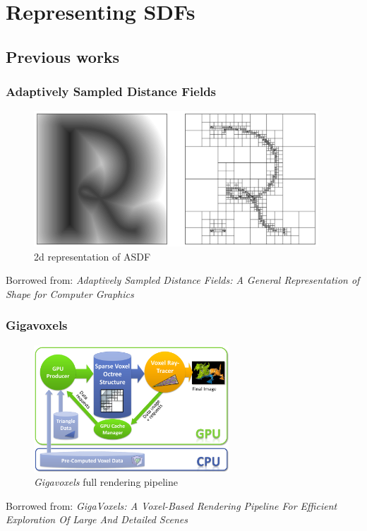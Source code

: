 \documentclass[handout]{beamer}
\begin{document}
\section{Representing SDFs}
\subsection{Previous works}
\begin{frame}
  \frametitle{Adaptively Sampled Distance Fields}
  \begin{figure}
    \centering
    \includegraphics[width=0.95\textwidth]{figures/asdf.png}
    \caption{2d representation of ASDF}
    \label{fig:asdf}
  \end{figure}
  \scriptsize Borrowed from: \textit{Adaptively Sampled Distance Fields: A General Representation of Shape for Computer Graphics}
\end{frame}
\begin{frame}
  \frametitle{Gigavoxels}
  \begin{figure}
    \centering
    \includegraphics[width=0.65\textwidth]{figures/gigavoxels-pipeline.png}
    \caption{\textit{Gigavoxels} full rendering pipeline}
    \label{fig:gigavoxels-pipeline}
  \end{figure}
  \scriptsize Borrowed from: \textit{GigaVoxels: A Voxel-Based Rendering Pipeline For Efficient Exploration Of Large And Detailed Scenes}
\end{frame}
\end{document}
